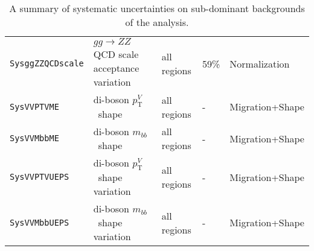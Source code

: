 \begin{table}[hb]
{\begin{tabular}{lllll}
      \texttt{SysggZZQCDscale} & $gg\to ZZ$ QCD scale acceptance variation & all regions & 59\% & Normalization\\
      \texttt{SysVVPTVME} & di-boson $p_{\mathrm{T}}^V$\ shape & all regions & - & Migration+Shape \\ 
      \texttt{SysVVMbbME} & di-boson $m_{bb}$\ shape & all regions & - & Migration+Shape \\ 
      \texttt{SysVVPTVUEPS} & di-boson $p_{\mathrm{T}}^V$\ shape variation & all regions & - & Migration+Shape \\
      \texttt{SysVVMbbUEPS} & di-boson $m_{bb}$\ shape variation & all regions & - & Migration+Shape\\
      \bottomrule
    \end{tabular}
  }
  \caption[A summary of systematic uncertainties on sub-dominant backgrounds of
  the analysis.]{A summary of systematic uncertainties on sub-dominant
    backgrounds of the analysis.}
  \label{tab:small_bkg_systematics}
\end{table}